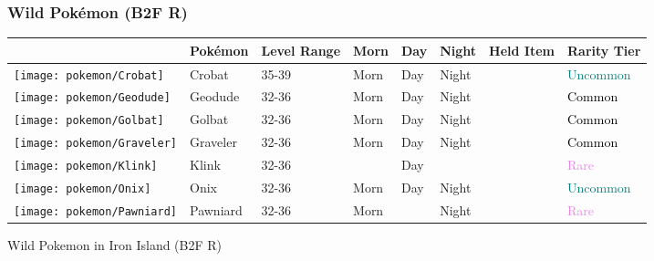 \subsubsection{Wild Pokémon (B2F R)}%
\label{ssubsec:WildPokmon(B2FR)}%
\begin{longtable}{||l l l l l l l l||}%
\hline%
&Pokémon&Level Range&Morn&Day&Night&Held Item&Rarity Tier\\%
\hline%
\endhead%
\hline%
\texttt{[image: pokemon/Crobat]}&Crobat&35{-}39&Morn&Day&Night&&\textcolor{teal}{%
Uncommon%
}\\%
\hline%
\texttt{[image: pokemon/Geodude]}&Geodude&32{-}36&Morn&Day&Night&&\textcolor{black}{%
Common%
}\\%
\hline%
\texttt{[image: pokemon/Golbat]}&Golbat&32{-}36&Morn&Day&Night&&\textcolor{black}{%
Common%
}\\%
\hline%
\texttt{[image: pokemon/Graveler]}&Graveler&32{-}36&Morn&Day&Night&&\textcolor{black}{%
Common%
}\\%
\hline%
\texttt{[image: pokemon/Klink]}&Klink&32{-}36&&Day&&&\textcolor{violet}{%
Rare%
}\\%
\hline%
\texttt{[image: pokemon/Onix]}&Onix&32{-}36&Morn&Day&Night&&\textcolor{teal}{%
Uncommon%
}\\%
\hline%
\texttt{[image: pokemon/Pawniard]}&Pawniard&32{-}36&Morn&&Night&&\textcolor{violet}{%
Rare%
}\\%
\hline%
\end{longtable}%
\caption{Wild Pokemon in Iron Island (B2F R)}